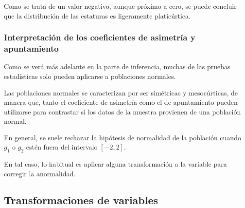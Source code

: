 \begin{frame}
{Como se trata de un valor negativo, aunque próximo a cero, se puede concluir que la distribución de las estaturas es ligeramente
platicúrtica. }
\end{frame}


\begin{frame}
\frametitle{Interpretación de los coeficientes de asimetría y apuntamiento}
Como se verá más adelante en la parte de inferencia, muchas de las pruebas estadísticas solo pueden aplicarse a poblaciones normales.

Las poblaciones normales se caracterizan por ser simétricas y mesocúrticas, de manera que, tanto el coeficiente de asimetría como el de apuntamiento pueden utilizarse para contrastar si los datos de la muestra provienen de una población normal.

En general, se suele rechazar la hipótesis de normalidad de la población cuando $g_1$ o $g_2$ estén fuera del intervalo $[-2,2]$.

En tal caso, lo habitual es aplicar alguna transformación a la variable para corregir la anormalidad.

\end{frame}


\subsection{Transformaciones de variables}

